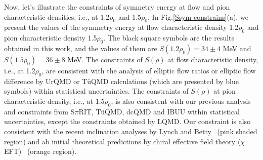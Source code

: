 \documentclass[reprint,aps,prc,twocolumn,superscriptaddress]{revtex4-1}
\begin{document}



Now, let's illustrate the constraints of symmetry energy at flow and pion characteristic densities, i.e., at 1.2$\rho_0$ and 1.5$\rho_0$. 
In Fig.\ref{Ssym-constrains}(a), we present the values of the symmetry energy at flow characteristic density 1.2$\rho_0$ and pion characteristic density 1.5$\rho_0$. The black square symbols are the results obtained in this work, and the values of them are $S(1.2\rho_0)=34\pm 4$ MeV and $S(1.5\rho_0)=36\pm 8$ MeV. %
The constraints of $S(\rho)$ at flow characteristic density, i.e., at 1.2$\rho_0$, are consistent with the analysis of elliptic flow ratios or elliptic flow difference by UrQMD\cite{WangYJ2014PRC} or T\"{u}QMD calculations\cite{Cozma2013PRC,Cozma2018EPJ} (which are presented by blue symbols) within statistical uncertainties. The constraints of $S(\rho)$ at pion characteristic density, i.e., at 1.5$\rho_0$, is also consistent with our previous analysis and constraints from S$\pi$RIT\cite{GJhang20}, T\"uQMD\cite{Cozma2016PLB}, dcQMD\cite{SpiRIT2021PRL} and IBUU\cite{ZGXiao2009PRL,GCYong2021PRC}  within statistical uncertainties, except the constraints obtained by LQMD\cite{ZQFeng2010PLB}. Our constraint is also consistent with the recent inclination analyses by Lynch and Betty~\cite{Lynch2022PLB} (pink shaded region) and ab initial theoretical predictions by chiral effective field theory ($\chi$EFT)~\cite{Drischler2020PRL} (orange region). %

\end{document}
